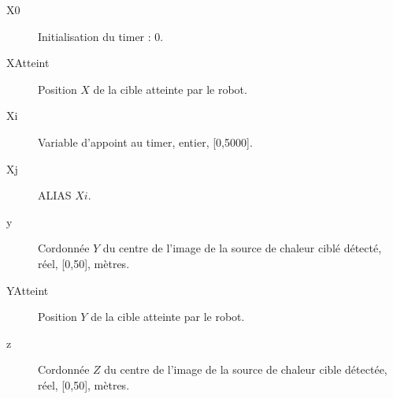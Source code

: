 \begin{description}
	\item [X0]\el
	Initialisation du timer : 0.

	\item [XAtteint]\el
	Position $X$ de la cible atteinte par le robot.

	\item [Xi]\el
	Variable d'appoint au timer, entier, [0,5000].

	\item [Xj]\el
	ALIAS $Xi$.

	\item [y]\el
	Cordonnée $Y$ du centre de l'image de la source de chaleur ciblé détecté, réel, [0,50], mètres.

	\item [YAtteint]\el
	Position $Y$ de la cible atteinte par le robot.

	\item [z]\el
	Cordonnée $Z$ du centre de l'image de la source de chaleur cible détectée, réel, [0,50], mètres.

\end{description}

\vfill
\pagebreak
